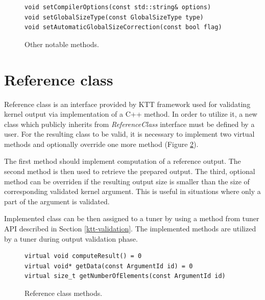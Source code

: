 \documentclass
[
    digital, %
    oneside, %
    table, %
    nolof, %
    nolot, %
    nocover %
]{fithesis3}
\begin{document}
\begin{figure}
\begin{adjustwidth}{-1cm}{-1cm}
\begin{lstlisting}
void setCompilerOptions(const std::string& options)
void setGlobalSizeType(const GlobalSizeType type)
void setAutomaticGlobalSizeCorrection(const bool flag)
\end{lstlisting}
\caption{Other notable methods.}
\label{ktt-utility-methods}
\end{adjustwidth}
\end{figure}

\section{Reference class}
\label{ktt-reference-class}
Reference class is an interface provided by KTT framework used for validating kernel output via implementation of a C++ method. In order to utilize it,
a new class which publicly inherits from \textit{ReferenceClass} interface must be defined by a user. For the resulting class to be valid, it is
necessary to implement two virtual methods and optionally override one more method (Figure \ref{ktt-reference-methods}).

The first method should implement computation of a reference output. The second method is then used to retrieve the prepared output. The third, optional
method can be overriden if the resulting output size is smaller than the size of corresponding validated kernel argument. This is useful in situations
where only a part of the argument is validated.

Implemented class can be then assigned to a tuner by using a method from tuner API described in Section \ref{ktt-validation}. The implemented
methods are utilized by a tuner during output validation phase.

\begin{figure}
\begin{adjustwidth}{-1cm}{-1cm}
\begin{lstlisting}
virtual void computeResult() = 0
virtual void* getData(const ArgumentId id) = 0
virtual size_t getNumberOfElements(const ArgumentId id)
\end{lstlisting}
\caption{Reference class methods.}
\label{ktt-reference-methods}
\end{adjustwidth}
\end{figure}
\end{document}
